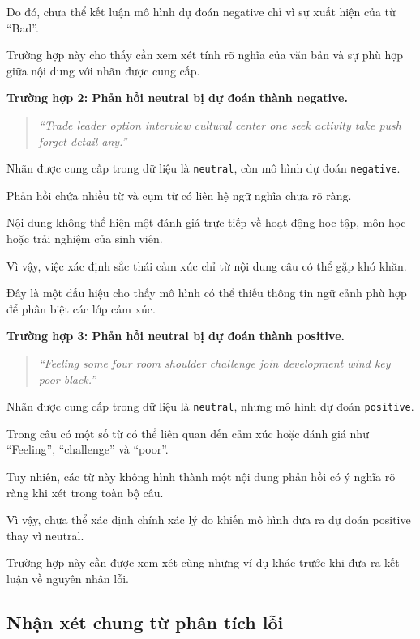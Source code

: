 Do đó, chưa thể kết luận mô hình dự đoán
negative chỉ vì sự xuất hiện của từ ``Bad''.

Trường hợp này cho thấy cần xem xét
tính rõ nghĩa của văn bản và sự phù hợp
giữa nội dung với nhãn được cung cấp.


\textbf{Trường hợp 2: Phản hồi neutral bị dự
đoán thành negative.}

\begin{quote}
\textit{``Trade leader option interview cultural
center one seek activity take push forget detail any.''}
\end{quote}

Nhãn được cung cấp trong dữ liệu là
\texttt{neutral}, còn mô hình dự đoán
\texttt{negative}.

Phản hồi chứa nhiều từ và cụm từ có liên hệ
ngữ nghĩa chưa rõ ràng.

Nội dung không thể hiện một đánh giá
trực tiếp về hoạt động học tập, môn học
hoặc trải nghiệm của sinh viên.

Vì vậy, việc xác định sắc thái cảm xúc
chỉ từ nội dung câu có thể gặp khó khăn.

Đây là một dấu hiệu cho thấy mô hình
có thể thiếu thông tin ngữ cảnh phù hợp
để phân biệt các lớp cảm xúc.


\textbf{Trường hợp 3: Phản hồi neutral bị dự
đoán thành positive.}

\begin{quote}
\textit{``Feeling some four room shoulder
challenge join development wind key poor black.''}
\end{quote}

Nhãn được cung cấp trong dữ liệu là
\texttt{neutral}, nhưng mô hình dự đoán
\texttt{positive}.

Trong câu có một số từ có thể liên quan
đến cảm xúc hoặc đánh giá như ``Feeling'',
``challenge'' và ``poor''.

Tuy nhiên, các từ này không hình thành
một nội dung phản hồi có ý nghĩa rõ ràng
khi xét trong toàn bộ câu.

Vì vậy, chưa thể xác định chính xác
lý do khiến mô hình đưa ra dự đoán
positive thay vì neutral.

Trường hợp này cần được xem xét cùng
những ví dụ khác trước khi đưa ra
kết luận về nguyên nhân lỗi.


\subsection{Nhận xét chung từ phân tích lỗi}


